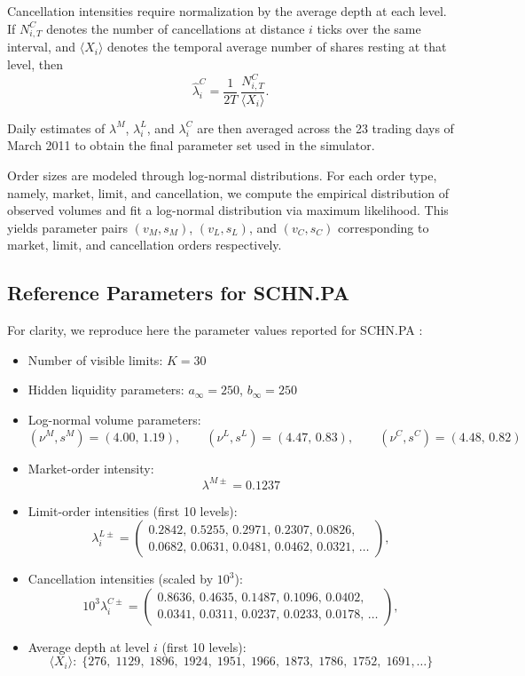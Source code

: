 Cancellation intensities require normalization by the average depth at each level. If
$N^{C}_{i,T}$ denotes the number of cancellations at distance $i$ ticks over the same
interval, and $\langle X_{i} \rangle$ denotes the temporal average number of shares resting at
that level, then
\begin{equation}
    \widehat{\lambda}^{C}_{i}
    = \frac{1}{2T}\,
      \frac{N^{C}_{i,T}}{\langle X_{i} \rangle}.
\end{equation}

Daily estimates of $\lambda^{M}$, $\lambda^{L}_{i}$, and $\lambda^{C}_{i}$ are then averaged
across the 23 trading days of March 2011 to obtain the final parameter set used in the
simulator.

Order sizes are modeled through log-normal distributions. For each order type, namely, market,
limit, and cancellation, we compute the empirical distribution of observed volumes and fit
a log-normal distribution via maximum likelihood. This yields parameter pairs
$(v_{M}, s_{M})$, $(v_{L}, s_{L})$, and $(v_{C}, s_{C})$ corresponding to market, limit, and
cancellation orders respectively.

\subsection*{Reference Parameters for SCHN.PA}

For clarity, we reproduce here the parameter values reported for SCHN.PA \cite{Abergel2016}:

\begin{itemize}
    \item Number of visible limits: $K = 30$
    \item Hidden liquidity parameters: $a_{\infty} = 250$, $b_{\infty} = 250$
    \item Log-normal volume parameters:
    \[
        (\nu^{M}, s^{M}) = (4.00,\,1.19), \qquad
        (\nu^{L}, s^{L}) = (4.47,\,0.83), \qquad
        (\nu^{C}, s^{C}) = (4.48,\,0.82)
    \]
    \item Market-order intensity:
    \[
        \lambda^{M\pm} = 0.1237
    \]
    \item Limit-order intensities (first 10 levels):
    \[
        \lambda^{L\pm}_{i} =
\begin{pmatrix}
0.2842,\, 0.5255,\, 0.2971,\, 0.2307,\, 0.0826,\, \\ 0.0682,\, 0.0631,\, 0.0481,\,
0.0462,\, 0.0321,\, \ldots
\end{pmatrix},
    \]
    \item Cancellation intensities (scaled by $10^{3}$):
    \[
        10^{3}\lambda^{C\pm}_{i} =
\begin{pmatrix}
0.8636,\, 0.4635,\, 0.1487,\, 0.1096,\, 0.0402,\, \\ 0.0341,\, 0.0311,\, 0.0237,\,
0.0233,\, 0.0178,\, \ldots
\end{pmatrix},
    \]
    \item Average depth at level $i$ (first 10 levels):
    \[
        \langle X_{i} \rangle :\;
        \{276,\; 1129,\; 1896,\; 1924,\; 1951,\; 1966,\; 1873,\;
        1786,\; 1752,\; 1691,\ldots\}
    \]
\end{itemize}


